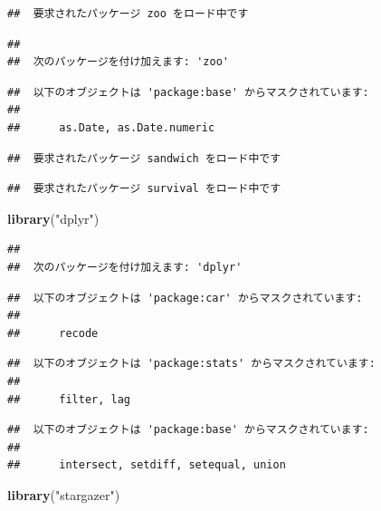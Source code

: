 \documentclass[]{book}
\newenvironment{Shaded}{\begin{snugshade}}{\end{snugshade}}
\newcommand{\KeywordTok}[1]{\textcolor[rgb]{0.13,0.29,0.53}{\textbf{#1}}}
\newcommand{\StringTok}[1]{\textcolor[rgb]{0.31,0.60,0.02}{#1}}
\newcommand{\NormalTok}[1]{#1}
\begin{document}
\begin{verbatim}
##  要求されたパッケージ zoo をロード中です
\end{verbatim}

\begin{verbatim}
## 
##  次のパッケージを付け加えます: 'zoo'
\end{verbatim}

\begin{verbatim}
##  以下のオブジェクトは 'package:base' からマスクされています: 
## 
##      as.Date, as.Date.numeric
\end{verbatim}

\begin{verbatim}
##  要求されたパッケージ sandwich をロード中です
\end{verbatim}

\begin{verbatim}
##  要求されたパッケージ survival をロード中です
\end{verbatim}

\begin{Shaded}
\begin{Highlighting}[]
\KeywordTok{library}\NormalTok{(}\StringTok{"dplyr"}\NormalTok{)}
\end{Highlighting}
\end{Shaded}

\begin{verbatim}
## 
##  次のパッケージを付け加えます: 'dplyr'
\end{verbatim}

\begin{verbatim}
##  以下のオブジェクトは 'package:car' からマスクされています: 
## 
##      recode
\end{verbatim}

\begin{verbatim}
##  以下のオブジェクトは 'package:stats' からマスクされています: 
## 
##      filter, lag
\end{verbatim}

\begin{verbatim}
##  以下のオブジェクトは 'package:base' からマスクされています: 
## 
##      intersect, setdiff, setequal, union
\end{verbatim}

\begin{Shaded}
\begin{Highlighting}[]
\KeywordTok{library}\NormalTok{(}\StringTok{"stargazer"}\NormalTok{)}
\end{Highlighting}
\end{Shaded}
\end{document}
